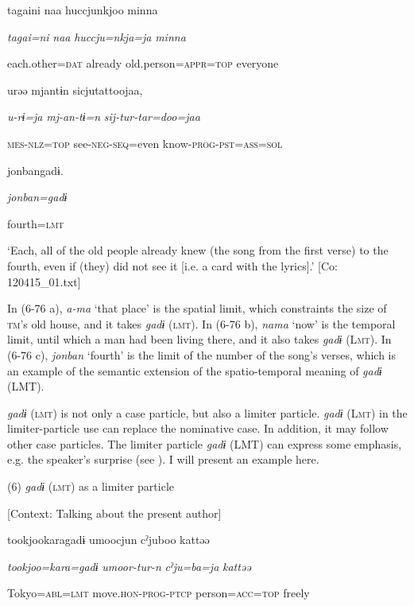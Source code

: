 {\TM}
\gll {\textbar}tagaini{\textbar}  naa  huccjunkjoo  minna

    \textit{tagai=ni}  \textit{naa}  \textit{huccju=nkja=ja}  \textit{minna}

    each.other=\textsc{dat}  already  old.person=\textsc{appr}=\textsc{top}  everyone

    urəə  mjantɨn  sicjutattoojaa,

    \textit{u-rɨ=ja}  \textit{mj-an-tɨ=n}  \textit{sij-tur-tar=doo=jaa}

    \textsc{mes}-\textsc{nlz}=\textsc{top}  see-\textsc{neg}-\textsc{seq}=even  know-\textsc{prog}-\textsc{pst}=\textsc{ass}=\textsc{sol}

    {\textbar}jonban{\textbar}gadɨ.

    \textit{jonban=gadɨ}

    fourth=\textsc{lmt}

\glt    ‘Each, all of the old people already knew (the song from the first verse) to the fourth, even if (they) did not see it [i.e. a card with the lyrics].’ [Co: 120415\_01.txt]
\z

In (6-76 a), \textit{a-ma} ‘that place’ is the spatial limit, which constraints the size of \textsc{tm}’s old house, and it takes \textit{gadɨ} (\textsc{lmt}). In (6-76 b), \textit{nama} ‘now’ is the temporal limit, until which a man had been living there, and it also takes \textit{gadɨ} (L\textsc{mt}). In (6-76 c), \textit{jonban} ‘fourth’ is the limit of the number of the song’s verses, which is an example of the semantic extension of the spatio-temporal meaning of \textit{gadɨ} (LMT).

\textit{gadɨ} (\textsc{lmt}) is not only a case particle, but also a limiter particle. \textit{gadɨ} (L\textsc{mt}) in the limiter-particle use can replace the nominative case. In addition, it may follow other case particles. The limiter particle \textit{gadɨ} (LMT) can express some emphasis, e.g. the speaker’s surprise (see ). I will present an example here.

(6)  \textit{gadɨ} (\textsc{lmt}) as a limiter particle

  [Context: Talking about the present author]

{\TM}
\gll tookjookaragadɨ  umoocjun  cˀjuboo  kattəə

    \textit{tookjoo=kara=gadɨ}  \textit{umoor-tur-n}  \textit{cˀju=ba=ja}  \textit{kattəə}

    Tokyo=\textsc{abl}=\textsc{lmt}  move.\textsc{hon}-\textsc{prog}-\textsc{ptcp}  person=\textsc{acc}=\textsc{top}  freely

